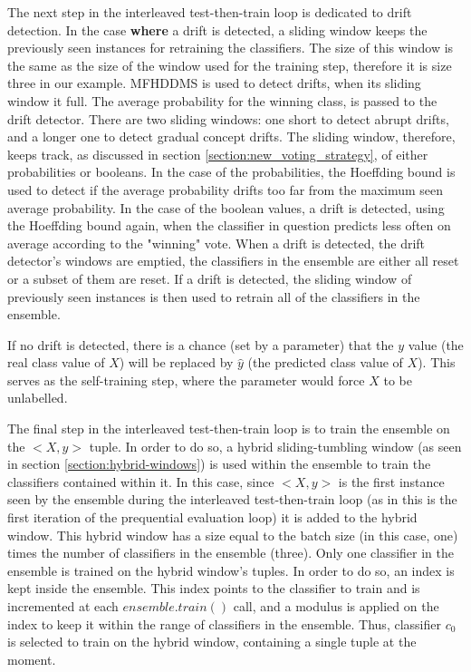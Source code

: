 The next step in the interleaved test-then-train loop is dedicated to drift detection. In the case \textbf{where }a drift is detected, a sliding window keeps the previously seen instances for retraining the classifiers. The size of this window is the same as the size of the window used for the training step, therefore it is size three in our example. MFHDDMS is used to detect drifts, when its sliding window it full. The average probability for the winning class, is passed to the drift detector. There are two sliding windows: one short to detect abrupt drifts, and a longer one to detect gradual concept drifts. The sliding window, therefore, keeps track, as discussed in section \ref{section:new_voting_strategy}, of either probabilities or booleans. In the case of the probabilities, the Hoeffding bound is used to detect if the average probability drifts too far from the maximum seen average probability. In the case of the boolean values, a drift is detected, using the Hoeffding bound again, when the classifier in question predicts less often on average according to the "winning" vote.
When a drift is detected, the drift detector's windows are emptied, the classifiers in the ensemble are either all reset or a subset of them are reset. 
If a drift is detected, the sliding window of previously seen instances is then used to retrain all of the classifiers in the ensemble.

If no drift is detected, there is a chance (set by a parameter) that the $y$ value (the real class value of $X$) will be replaced by $\hat y$ (the predicted class value of $X$). This serves as the self-training step, where the parameter would force $X$ to be unlabelled.

The final step in the interleaved test-then-train loop is to train the ensemble on the $<X, y>$ tuple. In order to do so, a hybrid sliding-tumbling window (as seen in section \ref{section:hybrid-windows}) is used within the ensemble to train the classifiers contained within it. In this case, since $<X, y>$ is the first instance seen by the ensemble during the interleaved test-then-train loop (as in this is the first iteration of the prequential evaluation loop) it is added to the hybrid window. This hybrid window has a size equal to the batch size (in this case, one) times the number of classifiers in the ensemble (three). 
Only one classifier in the ensemble is trained on the hybrid window's tuples. In order to do so, an index is kept inside the ensemble. This index points to the classifier to train and is incremented at each $ensemble.train()$ call, and a modulus is applied on the index to keep it within the range of classifiers in the ensemble.
Thus, classifier $c_0$ is selected to train on the hybrid window, containing a single tuple at the moment.

